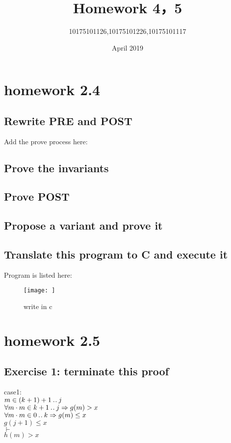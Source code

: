 \documentclass[11pt,a4paper,fleqn]{article}
\title{Homework 4，5}
\author{10175101126,10175101226,10175101117}
\date{April 2019}
\begin{document}
\maketitle

\section{ homework 2.4 }
\subsection{Rewrite PRE and POST }
\noindent
Add the prove process here: \\



\subsection{Prove the invariants}
\noindent


\subsection{ Prove POST}
\noindent




\subsection{Propose a variant and prove it}
\noindent


\subsection{Translate this program to C and execute it}
\noindent
Program is listed here:\\
\begin{figure}[h!]
\centering
\texttt{[image: ]}
\caption{ write in c}
\label{fig}
\end{figure}


\section{homework 2.5}

\subsection{Exercise 1: terminate this proof}
\noindent
case1:\\
$m \in (k + 1)+1 \mathbin{.\mkern1mu.} j$\\
$\forall m \cdot m \in k+1 \mathbin{.\mkern1mu.} j \Rightarrow g(m) > x  $\\
$\forall m \cdot m \in 0 \mathbin{.\mkern1mu.} k \Rightarrow g(m) \leq x $\\
$g(j+1) \leq x $\\
$\vdash$\\
$h(m)>x $\\
\end{document}
